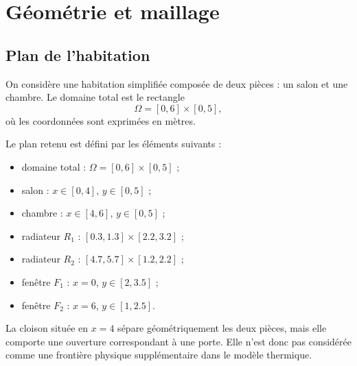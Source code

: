\documentclass[12pt,a4paper]{article}
\begin{document}
	
	\section{Géométrie et maillage}
	\label{sec:maillage}
	
	\subsection{Plan de l'habitation}
	
	On considère une habitation simplifiée composée de deux pièces : un
	salon et une chambre. Le domaine total est le rectangle
	\[
	\Omega=[0,6]\times[0,5],
	\]
	où les coordonnées sont exprimées en mètres.
	
	Le plan retenu est défini par les éléments suivants :
	\begin{itemize}
		\item domaine total : $\Omega=[0,6]\times[0,5]$ ;
		\item salon : $x\in[0,4]$, $y\in[0,5]$ ;
		\item chambre : $x\in[4,6]$, $y\in[0,5]$ ;
		\item radiateur $R_1$ : $[0.3,1.3]\times[2.2,3.2]$ ;
		\item radiateur $R_2$ : $[4.7,5.7]\times[1.2,2.2]$ ;
		\item fenêtre $F_1$ : $x=0$, $y\in[2,3.5]$ ;
		\item fenêtre $F_2$ : $x=6$, $y\in[1,2.5]$.
	\end{itemize}
	
	La cloison située en $x=4$ sépare géométriquement les deux pièces,
	mais elle comporte une ouverture correspondant à une porte. Elle n'est
	donc pas considérée comme une frontière physique supplémentaire dans
	le modèle thermique.
	
\end{document}
